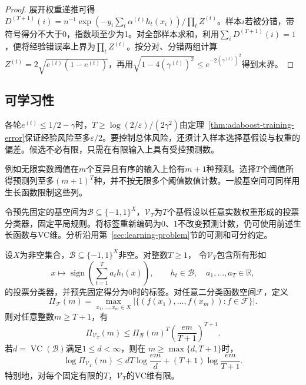 \begin{proof}
展开权重递推可得$D^{(T+1)}(i)=n^{-1}\exp(-y_i\sum_t\alpha^{(t)}h_t(x_i))/\prod_tZ^{(t)}$。样本$i$若被分错，带符号得分不大于0，指数项至少为1。对全部样本求和，利用$\sum_iD^{(T+1)}(i)=1$，便将经验错误率上界为$\prod_tZ^{(t)}$。按分对、分错两组计算$Z^{(t)}=2\sqrt{e^{(t)}(1-e^{(t)})}$，再用$\sqrt{1-4(\gamma^{(t)})^2}\leq e^{-2(\gamma^{(t)})^2}$得到末界。
\end{proof}

\subsection{可学习性}

各轮$e^{(t)}\leq1/2-\gamma$时，$T\geq\log(2/\varepsilon)/(2\gamma^2)$由定理~\ref{thm:adaboost-training-error}保证经验风险至多$\varepsilon/2$。要控制总体风险，还须计入样本选择基假设与权重的偏差。候选不必有限，只需在有限输入上具有受控预测数。

例如无限实数阈值在$m$个互异且有序的输入上恰有$m+1$种预测。选择$T$个阈值所得预测列至多$(m+1)^T$种，并不按无限多个阈值数值计数。一般基空间可同样用生长函数限制这些列。

令预先固定的基空间为$\mathcal B\subseteq\{-1,1\}^X$，$\mathcal V_T$为$T$个基假设以任意实数权重形成的投票分类器，固定平局规则。将标签重新编码为0、1不改变预测计数，仍可使用前述生长函数与VC维。分析沿用第~\ref{sec:learning-problem}节的可测和可分约定。

\begin{theorem}[投票假设空间的生长函数]
\label{thm:vote-growth-infinite}
设$X$为非空集合，$\mathcal B\subseteq\{-1,1\}^X$非空。对整数$T\geq1$，
令$\mathcal V_T$包含所有形如
\[
 x\mapsto\operatorname{sign}\!\left(\sum_{t=1}^T a_t h_t(x)\right),
 \qquad h_t\in\mathcal B,\quad a_1,\ldots,a_T\in\mathbb R,
\]
的投票分类器，并预先固定得分为0时的标签。对任意二分类函数空间$\mathcal F$，定义
\[
 \Pi_{\mathcal F}(m)
 =\max_{x_1,\ldots,x_m\in X}
 \left|\{(f(x_1),\ldots,f(x_m)):f\in\mathcal F\}\right|.
\]
则对任意整数$m\geq T+1$，有
\begin{equation}
 \Pi_{\mathcal V_T}(m)
 \leq\Pi_{\mathcal B}(m)^T
       \left(\frac{em}{T+1}\right)^{T+1}.
 \label{eq:boosting-vote-growth}
\end{equation}
若$d=\operatorname{VC}(\mathcal B)$满足$1\leq d<\infty$，则在
$m\geq\max\{d,T+1\}$时，
\begin{equation}
 \log\Pi_{\mathcal V_T}(m)
 \leq dT\log\frac{em}{d}+(T+1)\log\frac{em}{T+1}.
 \label{eq:infinite-boosting-growth}
\end{equation}
特别地，对每个固定有限的$T$，$\mathcal V_T$的VC维有限。
\end{theorem}


